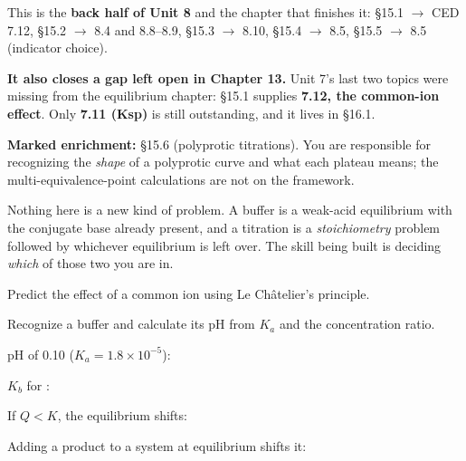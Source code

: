 \documentclass{apchem-notes}
\begin{document}
\apctitleblock

\begin{apcnote}
This is the \textbf{back half of Unit 8} and the chapter that finishes it:
\S15.1 $\to$ CED 7.12, \S15.2 $\to$ 8.4 and 8.8--8.9, \S15.3 $\to$ 8.10,
\S15.4 $\to$ 8.5, \S15.5 $\to$ 8.5 (indicator choice).

\textbf{It also closes a gap left open in Chapter 13.} Unit 7's last two
topics were missing from the equilibrium chapter: \S15.1 supplies
\textbf{7.12, the common-ion effect}. Only \textbf{7.11 (Ksp)} is still
outstanding, and it lives in \S16.1.

\textbf{Marked enrichment:} \S15.6 (polyprotic titrations). You are
responsible for recognizing the \emph{shape} of a polyprotic curve and what
each plateau means; the multi-equivalence-point calculations are not on the
framework.

Nothing here is a new kind of problem. A buffer is a weak-acid equilibrium
with the conjugate base already present, and a titration is a
\emph{stoichiometry} problem followed by whichever equilibrium is left over.
The skill being built is deciding \emph{which} of those two you are in.
\end{apcnote}


\begin{objectives}
  \item Predict the effect of a common ion using Le Ch\^atelier's principle.
  \item Recognize a buffer and calculate its pH from $K_a$ and the
        concentration ratio.
\end{objectives}


\begin{warmup}[4]
  \item pH of \SI{0.10}{\Molar}  ($K_a = 1.8\times10^{-5}$):
  \item $K_b$ for : 
  \item If $Q < K$, the equilibrium shifts: 
  \item Adding a product to a system at equilibrium shifts it:
\end{warmup}
\end{document}
